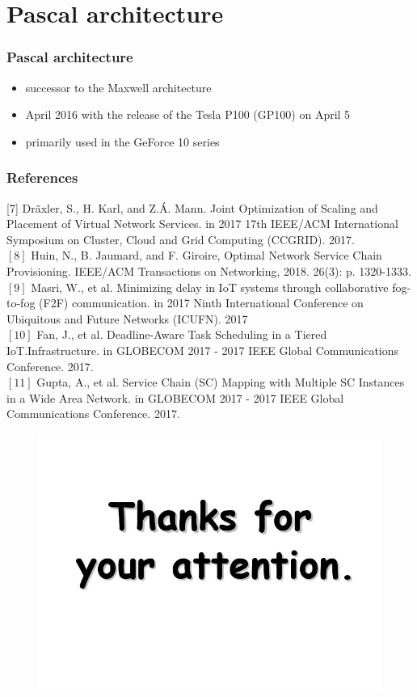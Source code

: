 \documentclass{beamer}
\begin{document}
\section{Pascal architecture}
\begin{frame}
 \frametitle{Pascal architecture}
 \begin{itemize}
 	\item {successor to the Maxwell architecture}
 	\item {April 2016 with the release of the Tesla P100 (GP100) on April 5}
 	\item {primarily used in the GeForce 10 series}
 \end{itemize}
\end{frame}
\begin{frame}

\frametitle{References}
[7] Drãxler, S., H. Karl, and Z.Á. Mann. Joint Optimization of Scaling and
Placement of Virtual Network Services. in 2017 17th IEEE/ACM
International Symposium on Cluster, Cloud and Grid Computing
(CCGRID). 2017.\\
$[8]$ Huin, N., B. Jaumard, and F. Giroire, Optimal Network Service Chain
Provisioning. IEEE/ACM Transactions on Networking, 2018. 26(3): p.
1320-1333.\\
$[9]$ Masri, W., et al. Minimizing delay in IoT systems through collaborative
fog-to-fog (F2F) communication. in 2017 Ninth International
Conference on Ubiquitous and Future Networks (ICUFN). 2017\\
$[10]$ Fan, J., et al. Deadline-Aware Task Scheduling in a Tiered IoT.Infrastructure. in GLOBECOM 2017 - 2017 IEEE Global Communications Conference. 2017.\\
$[11]$ Gupta, A., et al. Service Chain (SC) Mapping with Multiple SC
Instances in a Wide Area Network. in GLOBECOM 2017 - 2017 IEEE
Global Communications Conference. 2017.
\end{frame}
\begin{frame}
	
\begin{figure}
	\centering
	\includegraphics[width=0.7\linewidth]{thanks}
		\label{fig:thanks}
\end{figure}
\end{frame}
\end{document}
